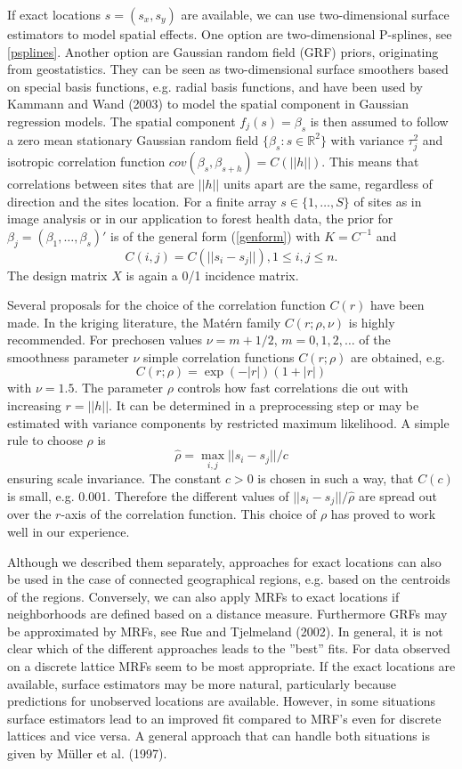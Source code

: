 \documentclass[11pt,a4paper,twoside]{bayesxarticle}
\begin{document}
If exact locations $s=(s_x,s_y)$ are available, we can use
two-dimensional surface estimators to model spatial effects. One
option are two-dimensional P-splines, see \autoref{psplines}.
Another option are Gaussian random field (GRF) priors, originating
from geostatistics. They can be seen as two-dimensional surface
smoothers based on special basis functions, e.g. radial basis
functions, and have been used by Kammann and Wand (2003) to model
the spatial component in Gaussian regression models. The spatial
component $f_{j}(s)=\beta_s$ is then assumed to follow a zero
mean stationary Gaussian random field
$\{\beta_s:s\in\mathbb{R}^2\}$ with variance $\tau_{j}^2$ and
isotropic correlation function
$cov(\beta_s,\beta_{s+h})=C(||h||)$. This means that correlations
between sites that are $||h||$ units apart are the same,
regardless of direction and the sites location. For a finite array
$s\in\{1,\ldots,S\}$ of sites as in image analysis or in our
application to forest health data, the prior for
$\beta_j=(\beta_1,\ldots,\beta_s)'$ is of the general form
(\ref{genform}) with $K=C^{-1}$ and
\[C(i,j)=C(||s_i-s_j||), 1\le i,j\le n.\]
The design matrix $X$ is again a 0/1 incidence matrix.

Several proposals for the choice of the correlation function
$C(r)$ have been made. In the kriging literature, the Mat\'{e}rn
family $C(r;\rho,\nu)$ is highly recommended. For prechosen values $\nu=m+1/2$,
$m=0,1,2,\ldots$ of the smoothness parameter $\nu$ simple
correlation functions $C(r;\rho)$ are obtained, e.g.
\[C(r;\rho)=\exp(-|r|)(1+|r|)\]
with $\nu=1.5$. The parameter $\rho$ controls how fast
correlations die out with increasing $r=||h||$. It can be
determined in a preprocessing step or may be estimated with
variance components by restricted maximum likelihood. A simple
rule to choose $\rho$ is
\[\hat{\rho}=\max_{i,j}||s_i-s_j||/c\]
ensuring scale invariance. The constant $c>0$ is chosen in such a
way, that $C(c)$ is small, e.g. 0.001. Therefore the different
values of $||s_i-s_j||/\hat{\rho}$ are spread out over the
$r$-axis of the correlation function. This choice of $\rho$ has
proved to work well in our experience.

Although we described them separately, approaches for exact
locations can also be used in the case of connected geographical
regions, e.g. based on the centroids of the regions. Conversely,
we can also apply MRFs to exact locations if neighborhoods are
defined based on a distance measure. Furthermore GRFs may be
approximated by MRFs, see Rue and Tjelmeland (2002). In general, it is
not clear which of the different approaches leads to the ''best''
fits. For data observed on a discrete lattice MRFs seem to be most
appropriate. If the exact locations are available, surface
estimators may be more natural, particularly because predictions
for unobserved locations are available. However, in some
situations surface estimators lead to an improved fit compared to
MRF's even for discrete lattices and vice versa. A general
approach that can handle both situations is given by
M\"{u}ller et al. (1997).
\end{document}
